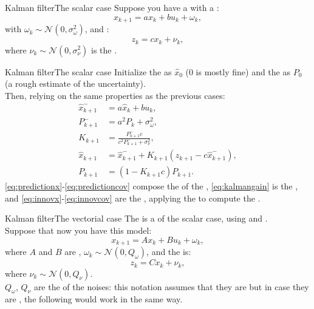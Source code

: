 \begin{frame}{Kalman filter}{The scalar case}
  Suppose you have a  with a :
  \begin{equation}
    x_{k+1} = ax_k + bu_k + \omega_k,
  \end{equation}
  with $\omega_k \sim \mathcal{N}(0,\sigma_{\omega}^2)$, and :
  \begin{equation}
    z_k = cx_k + \nu_k,
  \end{equation}
  where $\nu_k \sim \mathcal{N}(0,\sigma_{\nu}^2)$ is the .
\end{frame}
\begin{frame}{Kalman filter}{The scalar case}
  Initialize the  as $\hat{x}_0$ ($0$ is mostly fine) and the  as $P_0$ (a rough estimate of the uncertainty).\\
  Then, relying on the same properties as the previous cases:
  \begin{subequations}
    \begin{align}
      \hat{x}_{k+1}^{-} &= a\hat{x}_k + bu_k,\label{eq:predictionx}\\
      P_{k+1}^{-} &= a^2P_k + \sigma_{\omega}^2,\label{eq:predictioncov}\\
      K_{k+1} &= \frac{P_{k+1}^{-}c}{c^2P_{k+1}^{-} + \sigma_{\nu}^2},\label{eq:kalmangain}\\
      \hat{x}_{k+1} &= \hat{x}_{k+1}^{-} + K_{k+1}(z_{k+1} - c\hat{x}_{k+1}^{-}),\label{eq:innovx}\\
      P_{k+1} &= (1 - K_{k+1}c)P_{k+1}.\label{eq:innovcov}
    \end{align}
  \end{subequations}
  \eqref{eq:predictionx}-\eqref{eq:predictioncov} compose the  of the , \eqref{eq:kalmangain} is the , and \eqref{eq:innovx}-\eqref{eq:innovcov} are the , applying the  to compute the .
\end{frame}
\begin{frame}{Kalman filter}{The vectorial case}
  The  is a  of the scalar case, using  and .\\
  Suppose that now you have this model:
  \begin{equation}
    x_{k+1} = Ax_k + Bu_k + \omega_k,
  \end{equation}
  where $A$ and $B$ are , $\omega_k \sim \mathcal{N}(0,Q_{\omega})$, and the  is:
  \begin{equation}
    z_k = Cx_k + \nu_k,
  \end{equation}
  where $\nu_k \sim \mathcal{N}(0,Q_{\nu})$.\\
  $Q_\omega$, $Q_\nu$ are the  of the noises: this notation assumes that they are  but in case they are , the following would work in the same way.
\end{frame}
